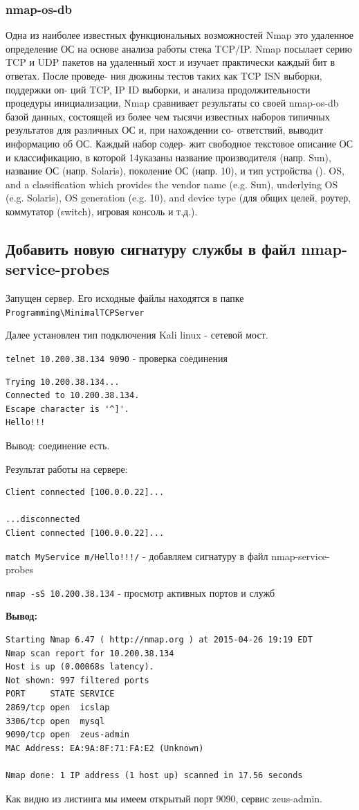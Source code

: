 \documentclass[12pt,a4paper]{article}
\begin{document}
\subsubsection{nmap-os-db}
Одна из наиболее известных функциональных возможностей Nmap
это удаленное определение ОС на основе анализа работы стека
TCP/IP. Nmap посылает серию TCP и UDP пакетов на удаленный
хост и изучает практически каждый бит в ответах. После проведе-
ния дюжины тестов таких как TCP ISN выборки, поддержки оп-
ций TCP, IP ID выборки, и анализа продолжительности процедуры
инициализации, Nmap сравнивает результаты со своей nmap-os-db
базой данных, состоящей из более чем тысячи известных наборов
типичных результатов для различных ОС и, при нахождении со-
ответствий, выводит информацию об ОС. Каждый набор содер-
жит свободное текстовое описание ОС и классификацию, в которой
14указаны название производителя (напр. Sun), название ОС (напр.
Solaris), поколение ОС (напр. 10), и тип устройства (). OS, and a
classification which provides the vendor name (e.g. Sun), underlying
OS (e.g. Solaris), OS generation (e.g. 10), and device type (для общих
целей, роутер, коммутатор (switch), игровая консоль и т.д.).
\subsection{Добавить новую сигнатуру службы в файл nmap-service-probes}
Запущен сервер. Его исходные файлы находятся в папке \verb+Programming\MinimalTCPServer+


Далее установлен тип подключения Kali linux  - сетевой мост. 


\verb+telnet 10.200.38.134 9090+  - проверка соединения
\begin{lstlisting}
Trying 10.200.38.134...
Connected to 10.200.38.134.
Escape character is '^]'.
Hello!!!
\end{lstlisting}
Вывод: соединение есть.

Результат работы на сервере:
\begin{lstlisting}
Client connected [100.0.0.22]...

...disconnected
Client connected [100.0.0.22]...
\end{lstlisting}
\verb+match MyService m/Hello!!!/+ - добавляем сигнатуру в файл nmap-service-probes

\verb+nmap -sS 10.200.38.134+ - просмотр активных портов и служб

\textbf{Вывод:}
\begin{lstlisting}
Starting Nmap 6.47 ( http://nmap.org ) at 2015-04-26 19:19 EDT
Nmap scan report for 10.200.38.134
Host is up (0.00068s latency).
Not shown: 997 filtered ports
PORT     STATE SERVICE
2869/tcp open  icslap
3306/tcp open  mysql
9090/tcp open  zeus-admin
MAC Address: EA:9A:8F:71:FA:E2 (Unknown)

Nmap done: 1 IP address (1 host up) scanned in 17.56 seconds

\end{lstlisting}
Как видно из листинга мы имеем открытый порт 9090, сервис zeus-admin.
\end{document}
